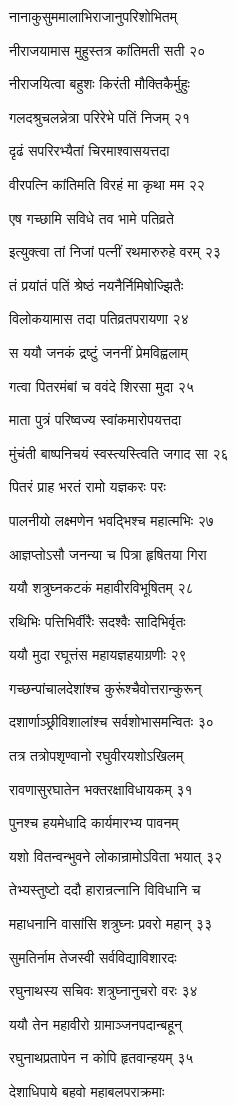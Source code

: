नानाकुसुममालाभिराजानुपरिशोभितम्

नीराजयामास मुहुस्तत्र कांतिमती सती २०

नीराजयित्वा बहुशः किरंती मौक्तिकैर्मुहुः

गलदश्रुचलन्नेत्रा परिरेभे पतिं निजम् २१

दृढं सपरिरभ्यैतां चिरमाश्वासयत्तदा

वीरपत्नि कांतिमति विरहं मा कृथा मम २२

एष गच्छामि सविधे तव भामे पतिव्रते

इत्युक्त्वा तां निजां पत्नीं रथमारुरुहे वरम् २३

तं प्रयांतं पतिं श्रेष्ठं नयनैर्निमिषोज्झितैः

विलोकयामास तदा पतिव्रतपरायणा २४

स ययौ जनकं द्रष्टुं जननीं प्रेमविह्वलाम्

गत्वा पितरमंबां च ववंदे शिरसा मुदा २५

माता पुत्रं परिष्वज्य स्वांकमारोपयत्तदा

मुंचंती बाष्पनिचयं स्वस्त्यस्त्विति जगाद सा २६

पितरं प्राह भरतं रामो यज्ञकरः परः

पालनीयो लक्ष्मणेन भवद्भिश्च महात्मभिः २७

आज्ञप्तोऽसौ जनन्या च पित्रा हृषितया गिरा

ययौ शत्रुघ्नकटकं महावीरविभूषितम् २८

रथिभिः पत्तिभिर्वीरैः सदश्वैः सादिभिर्वृतः

ययौ मुदा रघूत्तंस महायज्ञहयाग्रणीः २९

गच्छन्पांचालदेशांश्च कुरूंश्चैवोत्तरान्कुरून्

दशार्णाञ्छ्रीविशालांश्च सर्वशोभासमन्वितः ३०

तत्र तत्रोपशृण्वानो रघुवीरयशोऽखिलम्

रावणासुरघातेन भक्तरक्षाविधायकम् ३१

पुनश्च हयमेधादि कार्यमारभ्य पावनम्

यशो वितन्वन्भुवने लोकान्रामोऽविता भयात् ३२

तेभ्यस्तुष्टो ददौ हारान्रत्नानि विविधानि च

महाधनानि वासांसि शत्रुघ्नः प्रवरो महान् ३३

सुमतिर्नाम तेजस्वी सर्वविद्याविशारदः

रघुनाथस्य सचिवः शत्रुघ्नानुचरो वरः ३४

ययौ तेन महावीरो ग्रामाञ्जनपदान्बहून्

रघुनाथप्रतापेन न कोपि हृतवान्हयम् ३५

देशाधिपाये बहवो महाबलपराक्रमाः

